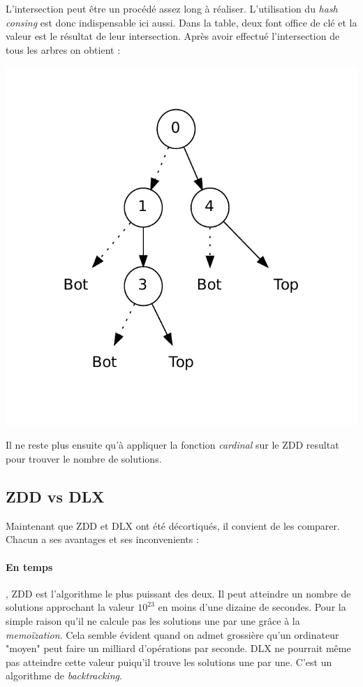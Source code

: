 \documentclass[a4paper]{article}
\begin{document}
L'intersection peut être un procédé assez long à réaliser. L'utilisation 
du \emph{hash consing} est donc indispensable ici aussi. Dans la table, deux 
font office de clé et la valeur est le résultat de leur intersection.
Après avoir effectué l'intersection de tous les arbres on obtient : 


\begin{center}
\includegraphics[scale=0.6]{../imports/inter.pdf}
\end{center}

Il ne reste plus ensuite qu'à appliquer la fonction \emph{cardinal} 
sur le ZDD resultat pour trouver le nombre de solutions. 

\subsection{ZDD vs DLX}

Maintenant que ZDD et DLX ont été décortiqués, il convient de les comparer.
Chacun a ses avantages et ses inconvenients :  


\paragraph{En temps}

, ZDD est l'algorithme le plus puissant des deux. Il peut
atteindre un nombre de solutions approchant la valeur $10^{23}$ en moins d'une 
dizaine de secondes. Pour la simple raison qu'il ne calcule pas les solutions
une par une grâce à la \emph{memoïzation}. Cela semble évident quand on admet
grossière qu'un ordinateur "moyen" peut faire un milliard d'opérations par
seconde. DLX ne pourrait même pas atteindre cette valeur puiqu'il trouve les 
solutions une par une. C'est un algorithme de \emph{backtracking}.
\end{document}
